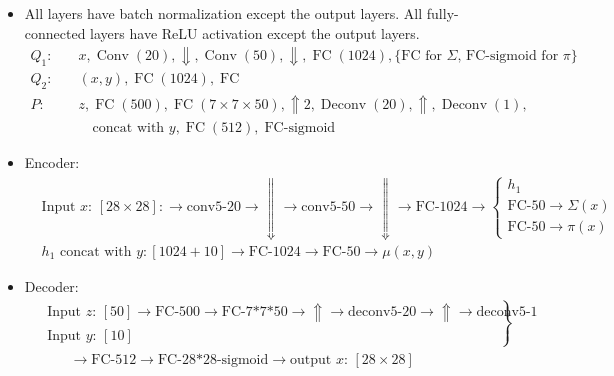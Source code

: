 \documentclass[10pt]{article}
\newcommand{\op}[1]{\operatorname{#1}}
\begin{document}
\begin{itemize}
\begin{itemize}
        \item All layers have batch normalization except the output layers. All fully-connected layers have ReLU activation except the output layers.
        \begin{align}
        Q_1:& \quad x,\op{Conv}(20), \Downarrow, \op{Conv}(50), \Downarrow, \op{FC}(1024), \{\text{FC for $\Sigma$, FC-sigmoid for $\pi$}\}\\
        Q_2:& \quad (x,y), \op{FC}(1024), \op{FC}\\
        P:& \quad z,\op{FC}(500),\op{FC}(7 \times 7 \times 50), \Uparrow 2,\op{Deconv}(20), \Uparrow, \op{Deconv}(1),\\
        &\qquad \text{concat with $y$},  \op{FC}(512), \op{FC-sigmoid}
        \end{align}
        \item Encoder:
        \begin{align}
            &\text{Input $x$: $[28 \times 28]$}:
            \to
            \text{conv5-20}
            \to
            \Downarrow
            \to
            \text{conv5-50}
            \to
            \Downarrow
            \to
            \text{FC-1024}
            \to
            \begin{cases}
            h_1\\
            \text{FC-50} \to \Sigma(x)\\
            \text{FC-50} \to \pi(x)
            \end{cases}\\
            &\text{$h_1$ concat with $y$}: [1024+10] \to
            \text{FC-1024}
            \to
            \text{FC-50}
            \to
            \mu(x,y)
        \end{align}
        \item Decoder:
        \begin{align}
        &\left.
        \begin{array}{r}
        \text{Input $z$: $[50]$}
        \to
        \text{FC-500}
        \to
        \text{FC-7*7*50}
        \to
        \Uparrow
        \to
        \text{deconv5-20}
        \to
        \Uparrow
        \to
        \text{deconv5-1}\\
        \text{Input $y$: $[10]$}
        \end{array}
        \right\}\\
        &\qquad\to
        \text{FC-512}
        \to
        \text{FC-28*28-sigmoid}
        \to
        \text{output $x$: $[28 \times 28]$}
        \end{align}

     \end{itemize}
\end{itemize}
\end{document}
